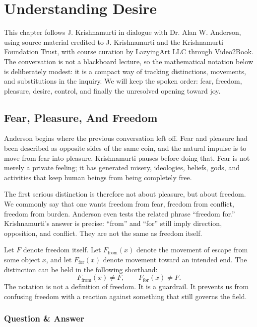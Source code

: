 \chapter{Understanding Desire}

This chapter follows J. Krishnamurti in dialogue with Dr. Alan W. Anderson, using source material credited to J. Krishnamurti and the Krishnamurti Foundation Trust, with course curation by LazyingArt LLC through Video2Book. The conversation is not a blackboard lecture, so the mathematical notation below is deliberately modest: it is a compact way of tracking distinctions, movements, and substitutions in the inquiry. We will keep the spoken order: fear, freedom, pleasure, desire, control, and finally the unresolved opening toward joy.

\section{Fear, Pleasure, And Freedom}

Anderson begins where the previous conversation left off. Fear and pleasure had been described as opposite sides of the same coin, and the natural impulse is to move from fear into pleasure. Krishnamurti pauses before doing that. Fear is not merely a private feeling; it has generated misery, ideologies, beliefs, gods, and activities that keep human beings from being completely free.

The first serious distinction is therefore not about pleasure, but about freedom. We commonly say that one wants freedom from fear, freedom from conflict, freedom from burden. Anderson even tests the related phrase ``freedom for.'' Krishnamurti's answer is precise: ``from'' and ``for'' still imply direction, opposition, and conflict. They are not the same as freedom itself.

Let \(F\) denote freedom itself. Let \(F_{\mathrm{from}}(x)\) denote the movement of escape from some object \(x\), and let \(F_{\mathrm{for}}(x)\) denote movement toward an intended end. The distinction can be held in the following shorthand:
\begin{equation}
F_{\mathrm{from}}(x) \neq F,
\qquad
F_{\mathrm{for}}(x) \neq F.
\end{equation}
The notation is not a definition of freedom. It is a guardrail. It prevents us from confusing freedom with a reaction against something that still governs the field.

\subsection{Question \& Answer}

